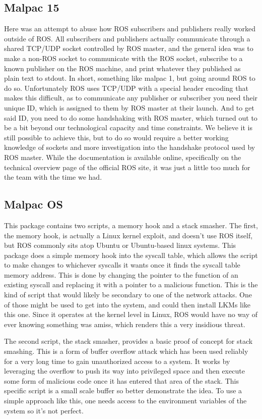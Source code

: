 \documentclass[IEEEtran,letterpaper,10pt,notitlepage,draftclsnofoot,onecolumn]{article}
\begin{document}
\subsection{Malpac 15}
Here was an attempt to abuse how ROS subscribers and publishers really worked outside of ROS. 
All subscribers and publishers actually communicate through a shared TCP/UDP socket controlled by ROS master, and the general idea was to make a non-ROS socket to communicate with the ROS socket, subscribe to a known publisher on the ROS machine, and print whatever they published as plain text to stdout. 
In short, something like malpac 1, but going around ROS to do so. Unfortunately ROS uses TCP/UDP with a special header encoding that makes this difficult, as to communicate any publisher or subscriber you need their unique ID, which is assigned to them by ROS master at their launch. 
And to get said ID, you need to do some handshaking with ROS master, which turned out to be a bit beyond our technological capacity and time constraints. 
We believe it is still possible to achieve this, but to do so would require a better working knowledge of sockets and more investigation into the handshake protocol used by ROS master. 
While the documentation is available online, specifically on the technical overview page of the official ROS site\cite{ROS}, it was just a little too much for the team with the time we had.

\subsection{Malpac OS}
This package contains two scripts, a memory hook and a stack smasher.
The first, the memory hook, is actually a Linux kernel exploit, and doesn't use ROS itself, but ROS commonly sits atop Ubuntu or Ubuntu-based linux systems. 
This package does a simple memory hook into the syscall table, which allows the script to make changes to whichever syscalls it wants once it finds the syscall table memory address. 
This is done by changing the pointer to the function of an existing syscall and replacing it with a pointer to a malicious function.
This is the kind of script that would likely be secondary to one of the network attacks. One of those might be used to get into the system, and could then install LKMs like this one. Since it operates at the kernel level in Linux, ROS would have no way of ever knowing something was amiss, which renders this a very insidious threat.

The second script, the stack smasher, provides a basic proof of concept for stack smashing. 
This is a form of buffer overflow attack which has been used reliably for a very long time to gain unauthorized access to a system. 
It works by leveraging the overflow to push its way into privileged space and then execute some form of malicious code once it has entered that area of the stack.
This specific script is a small scale buffer so better demonstrate the idea. 
To use a simple approach like this, one needs access to the environment variables of the system so it's not perfect. 
\end{document}
